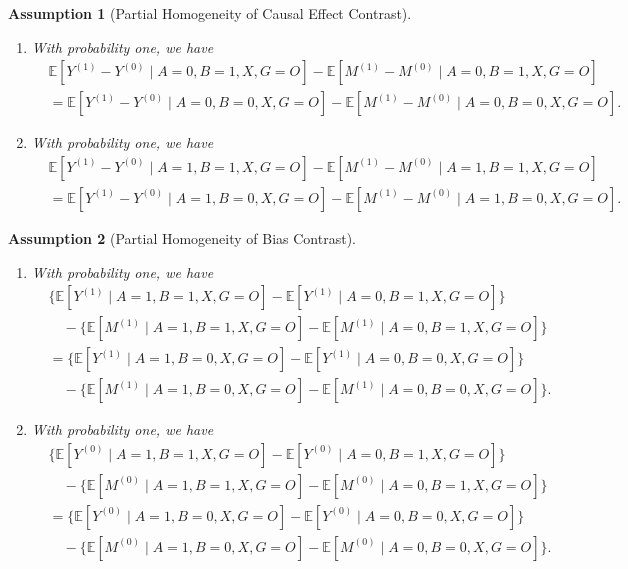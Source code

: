 \documentclass[10pt]{article}
\newtheorem{assumption}{Assumption}
\newcommand{\E}{\mathbb{E}}
\begin{document}
\begin{assumption}[Partial Homogeneity of Causal Effect Contrast]
\label{assumption:homogeneityETT::supp}
~
\begin{enumerate}[label=(\roman*)]
\item With probability one, we have
\begin{align*}
&\E[Y^{(1)}-Y^{(0)}\mid A=0,B=1,X,G=O]-\E[M^{(1)}-M^{(0)}\mid A=0,B=1,X,G=O]\\
&=\E[Y^{(1)}-Y^{(0)}\mid A=0,B=0,X,G=O]-\E[M^{(1)}-M^{(0)}\mid A=0,B=0,X,G=O].
\end{align*}
\item With probability one, we have
\begin{align*}
&\E[Y^{(1)}-Y^{(0)}\mid A=1,B=1,X,G=O]-\E[M^{(1)}-M^{(0)}\mid A=1,B=1,X,G=O]\\
&=\E[Y^{(1)}-Y^{(0)}\mid A=1,B=0,X,G=O]-\E[M^{(1)}-M^{(0)}\mid A=1,B=0,X,G=O].
\end{align*}
\end{enumerate}
\end{assumption}

\begin{assumption}[Partial Homogeneity of Bias Contrast]
\label{assumption:homogeneityBias::supp}
~
\begin{enumerate}[label=(\roman*)]
\item With probability one, we have
\begin{equation*}
\begin{aligned}
&\big\{\E[Y^{(1)}\mid A=1,B=1,X,G=O]-\E[Y^{(1)}\mid A=0,B=1,X,G=O]\big\}\\
&\quad-\big\{\E[M^{(1)}\mid A=1,B=1,X,G=O]-\E[M^{(1)}\mid A=0,B=1,X,G=O]\big\}\\
&=\big\{\E[Y^{(1)}\mid A=1,B=0,X,G=O]-\E[Y^{(1)}\mid A=0,B=0,X,G=O]\big\}\\
&\quad-\big\{\E[M^{(1)}\mid A=1,B=0,X,G=O]-\E[M^{(1)}\mid A=0,B=0,X,G=O]\big\}.
\end{aligned}
\end{equation*}
\item With probability one, we have
\begin{equation*}
\begin{aligned}
&\big\{\E[Y^{(0)}\mid A=1,B=1,X,G=O]-\E[Y^{(0)}\mid A=0,B=1,X,G=O]\big\}\\
&\quad-\big\{\E[M^{(0)}\mid A=1,B=1,X,G=O]-\E[M^{(0)}\mid A=0,B=1,X,G=O]\big\}\\
&=\big\{\E[Y^{(0)}\mid A=1,B=0,X,G=O]-\E[Y^{(0)}\mid A=0,B=0,X,G=O]\big\}\\
&\quad-\big\{\E[M^{(0)}\mid A=1,B=0,X,G=O]-\E[M^{(0)}\mid A=0,B=0,X,G=O]\big\}.
\end{aligned}
\end{equation*}
\end{enumerate}
\end{assumption}
\end{document}
